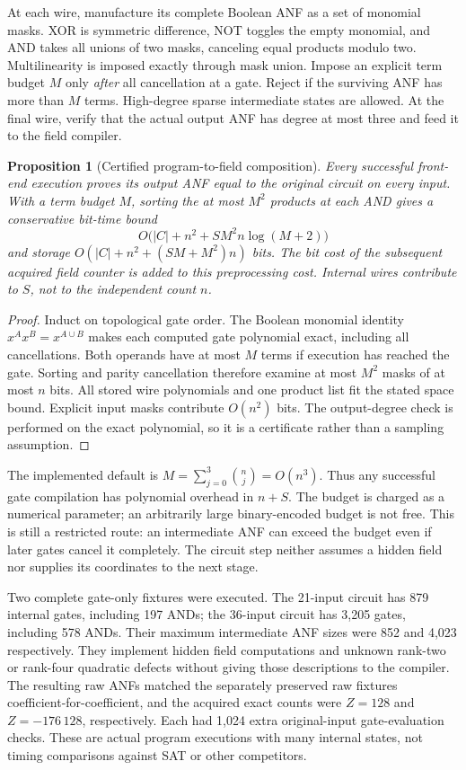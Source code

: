 \documentclass[11pt]{article}
\newtheorem{proposition}[theorem]{Proposition}
\theoremstyle{remark}\newtheorem{remark}[theorem]{Remark}
\begin{document}
At each wire, manufacture its complete Boolean ANF as a set of monomial masks. XOR is symmetric difference, NOT toggles the empty monomial, and AND takes all unions of two masks, canceling equal products modulo two. Multilinearity is imposed exactly through mask union. Impose an explicit term budget $M$ only \emph{after} all cancellation at a gate. Reject if the surviving ANF has more than $M$ terms. High-degree sparse intermediate states are allowed. At the final wire, verify that the actual output ANF has degree at most three and feed it to the field compiler.

\begin{proposition}[Certified program-to-field composition]
Every successful front-end execution proves its output ANF equal to the original circuit on every input. With a term budget $M$, sorting the at most $M^2$ products at each AND gives a conservative bit-time bound
\[
 O\bigl(|C|+n^2+SM^2n\log(M+2)\bigr)
\]
and storage $O(|C|+n^2+(SM+M^2)n)$ bits. The bit cost of the subsequent acquired field counter is added to this preprocessing cost. Internal wires contribute to $S$, not to the independent count $n$.
\end{proposition}
\begin{proof}
Induct on topological gate order. The Boolean monomial identity $x^Ax^B=x^{A\cup B}$ makes each computed gate polynomial exact, including all cancellations. Both operands have at most $M$ terms if execution has reached the gate. Sorting and parity cancellation therefore examine at most $M^2$ masks of at most $n$ bits. All stored wire polynomials and one product list fit the stated space bound. Explicit input masks contribute $O(n^2)$ bits. The output-degree check is performed on the exact polynomial, so it is a certificate rather than a sampling assumption.
\end{proof}

The implemented default is $M=\sum_{j=0}^3\binom nj=O(n^3)$. Thus any successful gate compilation has polynomial overhead in $n+S$. The budget is charged as a numerical parameter; an arbitrarily large binary-encoded budget is not free. This is still a restricted route: an intermediate ANF can exceed the budget even if later gates cancel it completely. The circuit step neither assumes a hidden field nor supplies its coordinates to the next stage.

Two complete gate-only fixtures were executed. The 21-input circuit has 879 internal gates, including 197 ANDs; the 36-input circuit has 3,205 gates, including 578 ANDs. Their maximum intermediate ANF sizes were 852 and 4,023 respectively. They implement hidden field computations and unknown rank-two or rank-four quadratic defects without giving those descriptions to the compiler. The resulting raw ANFs matched the separately preserved raw fixtures coefficient-for-coefficient, and the acquired exact counts were $Z=128$ and $Z=-176\,128$, respectively. Each had 1,024 extra original-input gate-evaluation checks. These are actual program executions with many internal states, not timing comparisons against SAT or other competitors.
\end{document}
